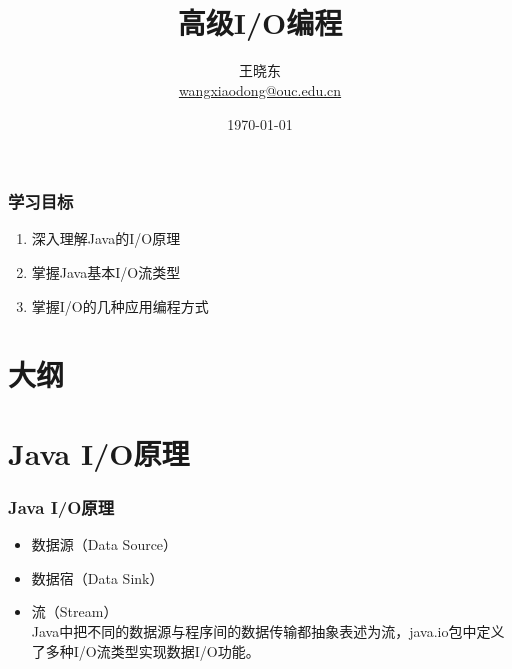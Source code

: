 
\title[KevinW@OUC]{\\  
  高级I/O编程}
\author[王晓东]{王晓东\\
  \href{mailto:wangxiaodong@ouc.edu.cn}{\footnotesize wangxiaodong@ouc.edu.cn}}
\date{\today}


\frame{\titlepage}
\begin{frame}
  \frametitle{学习目标}
  \begin{enumerate}
  \item 深入理解Java的I/O原理
  \item 掌握Java基本I/O流类型
  \item 掌握I/O的几种应用编程方式
  \end{enumerate}
\end{frame}
\section*{大纲}

\section{Java I/O原理}

\begin{frame}[fragile] %
\frametitle{Java I/O原理}


\begin{itemize}
\item 数据源（Data Source）
\item 数据宿（Data Sink）
\item 流（Stream）\\
  {\kai Java中把不同的数据源与程序间的数据传输都抽象表述为流，java.io包中定义
    了多种I/O流类型实现数据I/O功能。}
\end{itemize}
\end{frame}

